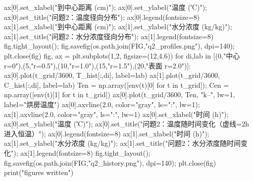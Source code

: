 \begin{codelisting}
ax[0].set_xlabel("到中心距离 (cm)"); ax[0].set_ylabel("温度 (℃)"); ax[0].set_title("问题2：温度径向分布"); ax[0].legend(fontsize=8)
ax[1].set_xlabel("到中心距离 (cm)"); ax[1].set_ylabel("水分浓度 (kg/kg)"); ax[1].set_title("问题2：水分浓度径向分布"); ax[1].legend(fontsize=8)
fig.tight_layout(); fig.savefig(os.path.join(FIG,"q2_profiles.png"), dpi=140); plt.close(fig)
fig, ax = plt.subplots(1,2, figsize=(12,4.6))
for di,lab in [(0,"中心 r=0"),(5,"r=0.5"),(10,"r=1.0"),(15,"r=1.5"),(20,"表面 r=2.0")]:
    ax[0].plot(t_grid/3600, T_hist[:,di], label=lab)
    ax[1].plot(t_grid/3600, C_hist[:,di], label=lab)
Ten = np.array([env(t)[0] for t in t_grid]); Cen = np.array([env(t)[1] for t in t_grid])
ax[0].plot(t_grid/3600, Ten, "k--", lw=1, label="烘房温度")
ax[0].axvline(2.0, color="gray", ls=":", lw=1); ax[1].axvline(2.0, color="gray", ls=":", lw=1)
ax[0].set_xlabel("时间 (h)"); ax[0].set_ylabel("温度 (℃)"); ax[0].set_title("问题2：温度随时间变化（虚线=2h进入恒温）"); ax[0].legend(fontsize=8)
ax[1].set_xlabel("时间 (h)"); ax[1].set_ylabel("水分浓度 (kg/kg)"); ax[1].set_title("问题2：水分浓度随时间变化"); ax[1].legend(fontsize=8)
fig.tight_layout(); fig.savefig(os.path.join(FIG,"q2_history.png"), dpi=140); plt.close(fig)
print("figures written")
\end{codelisting}

